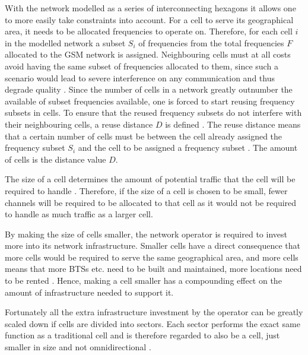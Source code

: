 With the network modelled as a series of interconnecting hexagons it allows one to more easily take constraints into account. For a cell to serve its geographical area, it needs to be allocated frequencies to operate on. Therefore, for each cell $i$ in the modelled network a subset $S_i$ of frequencies from the total frequencies $F$ allocated to the GSM network is assigned\cite{GSMArchitectureProtocolsServices}. Neighbouring cells must at all costs avoid having the same subset of frequencies allocated to them, since such a scenario would lead to severe interference on any communication and thus degrade quality \cite{GSMArchitectureProtocolsServices}.
Since the number of cells in a network greatly outnumber the available of subset frequencies available, one is forced to start reusing frequency subsets in cells. To ensure that the reused frequency subsets do not interfere with their neighbouring cells, a reuse distance $D$ is defined \cite{GSMArchitectureProtocolsServices}. The reuse distance means that a certain number of cells must be between the cell already assigned the frequency subset $S_i$ and the cell to be assigned a frequency subset \cite{GSMArchitectureProtocolsServices}. The amount of cells is the distance value $D$.

The size of a cell determines the amount of potential traffic that the cell will be required to handle \cite{GSM92,Eisenblatter,GSMArchitectureProtocolsServices}. Therefore, if the size of a cell is chosen to be small, fewer channels will be required to be allocated to that cell as it would not be required to handle as much traffic as a larger cell. 

By making the size of cells smaller, the network operator is required to invest more into its network infrastructure. Smaller cells have a direct consequence that more cells would be required to serve the same geographical area, and more cells means that more BTSs etc. need to be built and maintained, more locations need to be rented \cite{GSMArchitectureProtocolsServices}. Hence, making a cell smaller has a compounding effect on the amount of infrastructure needed to support it.

Fortunately all the extra infrastructure investment by the operator can be greatly scaled down if cells are divided into sectors\label{def:cellsector}. Each sector performs the exact same function as a traditional cell and is therefore regarded to also be a cell, just smaller in size and not omnidirectional \cite{GSMArchitectureProtocolsServices,GSM92,GSMSysEngin}. 

